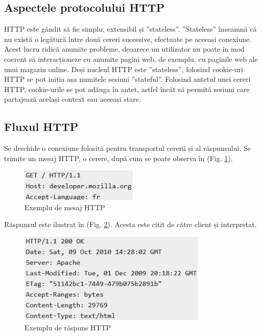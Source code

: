 \subsection{Aspectele protocolului HTTP}
HTTP este gândit să fie simplu, extensibil și ”stateless”. ”Stateless” înseamnă că nu există o legătură între două cereri succesive, efectuate pe aceeași conexiune. Acest lucru ridică anumite probleme, deoarece un utilizator nu poate în mod coerent să interacționeze cu anumite pagini web, de exemplu, cu paginile web ale unui magazin online. Deși nucleul HTTP este ”stateless”, folosind cookie-uri HTTP se pot iniția așa numitele sesiuni ”stateful”. Folosind antetul unei cereri HTTP, cookie-urile se pot adăuga în antet, astfel încăt să permită sesiuni care partajează același context sau aceeași stare.

\subsection{Fluxul HTTP}
Se deschide o conexiune folosită pentru transportul cererii și al răspunsului.
Se trimite un mesaj HTTP, o cerere, după cum se poate observa în (Fig. \ref{fig:22}).

\begin{figure}[!htb]
	\centering
	\includegraphics[width=0.5\textwidth]
	{../LaTeX/Images/http_message.PNG}
	\caption{Exemplu de mesaj HTTP}
	\label{fig:22}
\end{figure}

Răspunsul este ilustrat în (Fig. \ref{fig:23}). Acesta este citit de către client și interpretat.

\begin{figure}[!htb]
	\centering
	\includegraphics[width=0.8\textwidth]
	{../LaTeX/Images/http_response.PNG}
	\caption{Exemplu de răspuns HTTP}
	\label{fig:23}
\end{figure}

